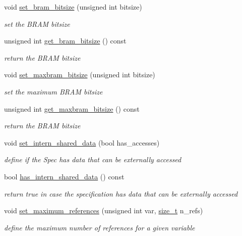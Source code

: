 \begin{DoxyCompactItemize}
void \hyperlink{classmemory_a7d924bbfab481c80b2770c59f2824b35}{set\+\_\+bram\+\_\+bitsize} (unsigned int bitsize)
\begin{DoxyCompactList}\small\item\em set the B\+R\+AM bitsize \end{DoxyCompactList}\item 
unsigned int \hyperlink{classmemory_ac82303660a64f1638acd37265f20a48a}{get\+\_\+bram\+\_\+bitsize} () const
\begin{DoxyCompactList}\small\item\em return the B\+R\+AM bitsize \end{DoxyCompactList}\item 
void \hyperlink{classmemory_a47b943a6e371ccdd0d4465be99b6c240}{set\+\_\+maxbram\+\_\+bitsize} (unsigned int bitsize)
\begin{DoxyCompactList}\small\item\em set the maximum B\+R\+AM bitsize \end{DoxyCompactList}\item 
unsigned int \hyperlink{classmemory_a2c60a1b44b29221ddd9ac291afffd4d6}{get\+\_\+maxbram\+\_\+bitsize} () const
\begin{DoxyCompactList}\small\item\em return the B\+R\+AM bitsize \end{DoxyCompactList}\item 
void \hyperlink{classmemory_a2a4b7aa0153f24a50385b370c260cec0}{set\+\_\+intern\+\_\+shared\+\_\+data} (bool has\+\_\+accesses)
\begin{DoxyCompactList}\small\item\em define if the Spec has data that can be externally accessed \end{DoxyCompactList}\item 
bool \hyperlink{classmemory_a815f393ee72721eb6ccdf002441b1b0f}{has\+\_\+intern\+\_\+shared\+\_\+data} () const
\begin{DoxyCompactList}\small\item\em return true in case the specification has data that can be externally accessed \end{DoxyCompactList}\item 
void \hyperlink{classmemory_aae0ad53726eef6b63a98acb7096c3418}{set\+\_\+maximum\+\_\+references} (unsigned int var, \hyperlink{tutorial__fpt__2017_2intro_2sixth_2test_8c_a7c94ea6f8948649f8d181ae55911eeaf}{size\+\_\+t} n\+\_\+refs)
\begin{DoxyCompactList}\small\item\em define the maximum number of references for a given variable \end{DoxyCompactList}\item 

\end{DoxyCompactItemize}
